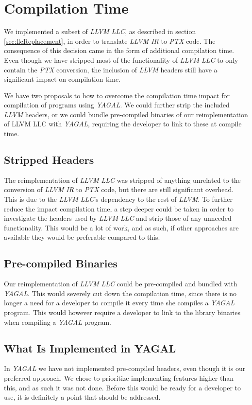\section{Compilation Time}

We implemented a subset of \textit{LLVM LLC}, as described in section \ref{sec:llcReplacement}, in order to translate \textit{LLVM IR} to \textit{PTX} code. The consequence of this decision came in the form of additional compilation time. Even though we have stripped most of the functionality of \textit{LLVM LLC} to only contain the \textit{PTX} conversion, the inclusion of \textit{LLVM} headers still have a significant impact on compilation time.

We have two proposals to how to overcome the compilation time impact for compilation of programs using \textit{YAGAL}. We could further strip the included \textit{LLVM} headers, or we could bundle pre-compiled binaries of our reimplementation of {LLVM LLC} with \textit{YAGAL}, requiring the developer to link to these at compile time.

\subsection{Stripped Headers}
The reimplementation of \textit{LLVM LLC} was stripped of anything unrelated to the conversion of \textit{LLVM IR} to \textit{PTX} code, but there are still significant overhead. This is due to the \textit{LLVM LLC}'s dependency to the rest of \textit{LLVM}. To further reduce the impact compilation time, a step deeper could be taken in order to investigate the headers used by \textit{LLVM LLC} and strip those of any unneeded functionality. This would be a lot of work, and as such, if other approaches are available they would be preferable compared to this.


\subsection{Pre-compiled Binaries}
Our reimplementation of \textit{LLVM LLC} could be pre-compiled and bundled with \textit{YAGAL}. This would severely cut down the compilation time, since there is no longer a need for a developer to compile it every time she compiles a \textit{YAGAL} program. This would however require a developer to link to the library binaries when compiling a \textit{YAGAL} program.

\subsection{What Is Implemented in YAGAL}
In \textit{YAGAL} we have not implemented pre-compiled headers, even though it is our preferred approach. We chose to prioritize implementing features higher than this, and as such it was not done. Before this would be ready for a developer to use, it is definitely a point that should be addressed.